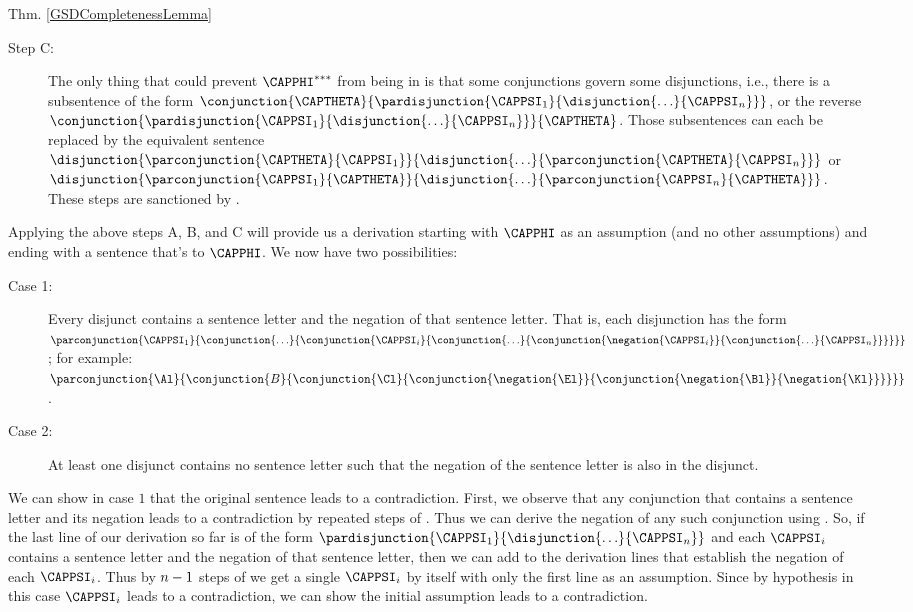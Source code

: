 \begin{PROOFOF}{Thm. \ref{GSDCompletenessLemma}}
\begin{description}
\item[Step C:]
The only thing that could prevent $\CAPPHI^{***}$ from being in  is that some conjunctions govern some disjunctions, i.e., there is a subsentence of the form $\conjunction{\CAPTHETA}{\pardisjunction{\CAPPSI_1}{\disjunction{\ldots}{\CAPPSI_{\integer{n}}}}}$, or the reverse $\conjunction{\pardisjunction{\CAPPSI_1}{\disjunction{\ldots}{\CAPPSI_{\integer{n}}}}}{\CAPTHETA}$.
Those subsentences can each be replaced by the equivalent sentence $\disjunction{\parconjunction{\CAPTHETA}{\CAPPSI_1}}{\disjunction{\ldots}{\parconjunction{\CAPTHETA}{\CAPPSI_{\integer{n}}}}}$ or $\disjunction{\parconjunction{\CAPPSI_1}{\CAPTHETA}}{\disjunction{\ldots}{\parconjunction{\CAPPSI_{\integer{n}}}{\CAPTHETA}}}$.
These steps are sanctioned by .
\end{description}
\noindent{}Applying the above steps A, B, and C will provide us a derivation starting with $\CAPPHI$ as an assumption (and no other assumptions) and ending with a  sentence that's  to $\CAPPHI$. 
We now have two possibilities:
\begin{description}
\item[Case 1:] 
Every disjunct contains a sentence letter and the negation of that sentence letter. 
That is, each disjunction has the form $\parconjunction{\CAPPSI_1}{\conjunction{\ldots}{\conjunction{\CAPPSI_{\integer{i}}}{\conjunction{\ldots}{\conjunction{\negation{\CAPPSI_{\integer{i}}}}{\conjunction{\ldots}{\CAPPSI_{\integer{n}}}}}}}}$; for example: $\parconjunction{\Al}{\conjunction{B}{\conjunction{\Cl}{\conjunction{\negation{\El}}{\conjunction{\negation{\Bl}}{\negation{\Kl}}}}}}$.

\item[Case 2:]
At least one disjunct contains no sentence letter such that the negation of the sentence letter is also in the disjunct. 
\end{description}
\noindent{}We can show in case $1$ that the original sentence leads to a contradiction.
First, we observe that any conjunction that contains a sentence letter and its negation leads to a contradiction by repeated steps of . 
Thus we can derive the negation of any such conjunction using .
So, if the last line of our derivation so far is of the form $\pardisjunction{\CAPPSI_1}{\disjunction{\ldots}{\CAPPSI_{\integer{n}}}}$ and each $\CAPPSI_{\integer{i}}$ contains a sentence letter and the negation of that sentence letter, then we can add to the derivation lines that establish the negation of each $\CAPPSI_{\integer{i}}$. 
Thus by $n-1$ steps of  we get a single $\CAPPSI_{\integer{i}}$ by itself with only the first line as an assumption.
Since by hypothesis in this case $\CAPPSI_{\integer{i}}$ leads to a contradiction, we can show the initial assumption leads to a contradiction.  %



\end{PROOFOF}
